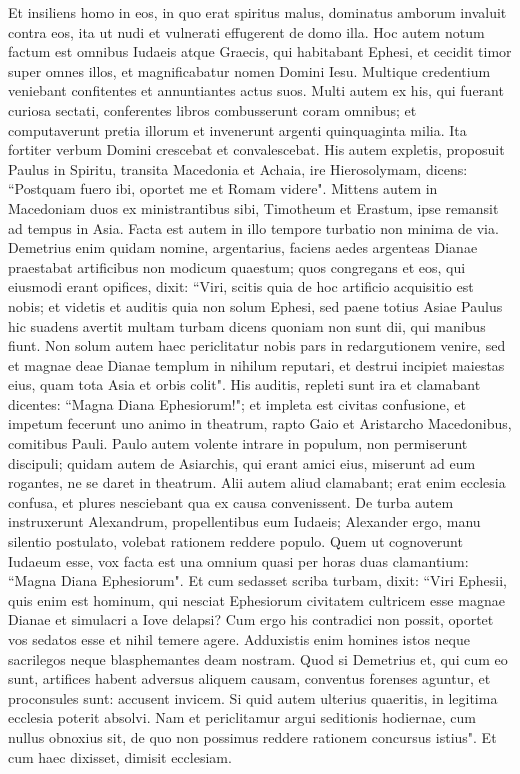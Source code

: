\begin{biblechapter}
\verse Et insiliens homo in eos, in quo erat spiritus malus, dominatus amborum invaluit contra eos, ita ut nudi et vulnerati effugerent de domo illa. 
\verse Hoc autem notum factum est omnibus Iudaeis atque Graecis, qui habitabant Ephesi, et cecidit timor super omnes illos, et magnificabatur nomen Domini Iesu. 
\verse Multique credentium veniebant confitentes et annuntiantes actus suos. 
\verse Multi autem ex his, qui fuerant curiosa sectati, conferentes libros combusserunt coram omnibus; et computaverunt pretia illorum et invenerunt argenti quinquaginta milia. 
\verse Ita fortiter verbum Domini crescebat et convalescebat. 
\verse His autem expletis, proposuit Paulus in Spiritu, transita Macedonia et Achaia, ire Hierosolymam, dicens: “Postquam fuero ibi, oportet me et Romam videre". 
\verse Mittens autem in Macedoniam duos ex ministrantibus sibi, Timotheum et Erastum, ipse remansit ad tempus in Asia. 
\verse Facta est autem in illo tempore turbatio non minima de via. 
\verse Demetrius enim quidam nomine, argentarius, faciens aedes argenteas Dianae praestabat artificibus non modicum quaestum; 
\verse quos congregans et eos, qui eiusmodi erant opifices, dixit: “Viri, scitis quia de hoc artificio acquisitio est nobis; 
\verse et videtis et auditis quia non solum Ephesi, sed paene totius Asiae Paulus hic suadens avertit multam turbam dicens quoniam non sunt dii, qui manibus fiunt. 
\verse Non solum autem haec periclitatur nobis pars in redargutionem venire, sed et magnae deae Dianae templum in nihilum reputari, et destrui incipiet maiestas eius, quam tota Asia et orbis colit". 
\verse His auditis, repleti sunt ira et clamabant dicentes: “Magna Diana Ephesiorum!"; 
\verse et impleta est civitas confusione, et impetum fecerunt uno animo in theatrum, rapto Gaio et Aristarcho Macedonibus, comitibus Pauli. 
\verse Paulo autem volente intrare in populum, non permiserunt discipuli; 
\verse quidam autem de Asiarchis, qui erant amici eius, miserunt ad eum rogantes, ne se daret in theatrum. 
\verse Alii autem aliud clamabant; erat enim ecclesia confusa, et plures nesciebant qua ex causa convenissent. 
\verse De turba autem instruxerunt Alexandrum, propellentibus eum Iudaeis; Alexander ergo, manu silentio postulato, volebat rationem reddere populo. 
\verse Quem ut cognoverunt Iudaeum esse, vox facta est una omnium quasi per horas duas clamantium: “Magna Diana Ephesiorum". 
\verse Et cum sedasset scriba turbam, dixit: “Viri Ephesii, quis enim est hominum, qui nesciat Ephesiorum civitatem cultricem esse magnae Dianae et simulacri a Iove delapsi? 
\verse Cum ergo his contradici non possit, oportet vos sedatos esse et nihil temere agere. 
\verse Adduxistis enim homines istos neque sacrilegos neque blasphemantes deam nostram. 
\verse Quod si Demetrius et, qui cum eo sunt, artifices habent adversus aliquem causam, conventus forenses aguntur, et proconsules sunt: accusent invicem.  
\verse Si quid autem ulterius quaeritis, in legitima ecclesia poterit absolvi.  
\verse Nam et periclitamur argui seditionis hodiernae, cum nullus obnoxius sit, de quo non possimus reddere rationem concursus istius". Et cum haec dixisset, dimisit ecclesiam. 
\end{biblechapter}

